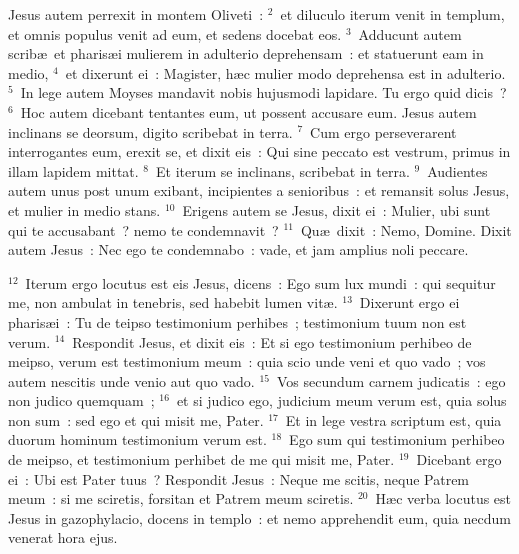 \lettrine[lines=3,image=true,loversize=0.05,lraise=-0.03]{J}{}esus autem perrexit in montem Oliveti~:
${}^{2}$~et diluculo iterum venit in templum, et omnis populus venit ad eum, et sedens docebat eos.
${}^{3}$~Adducunt autem scrib\ae\ et pharis\ae i mulierem in adulterio deprehensam~: et statuerunt eam in medio,
${}^{4}$~et dixerunt ei~: Magister, h\ae c mulier modo deprehensa est in adulterio.
${}^{5}$~In lege autem Moyses mandavit nobis hujusmodi lapidare. Tu ergo quid dicis~?
${}^{6}$~Hoc autem dicebant tentantes eum, ut possent accusare eum. Jesus autem inclinans se deorsum, digito scribebat in terra.
${}^{7}$~Cum ergo perseverarent interrogantes eum, erexit se, et dixit eis~: Qui sine peccato est vestrum, primus in illam lapidem mittat.
${}^{8}$~Et iterum se inclinans, scribebat in terra.
${}^{9}$~Audientes autem unus post unum exibant, incipientes a senioribus~: et remansit solus Jesus, et mulier in medio stans.
${}^{10}$~Erigens autem se Jesus, dixit ei~: Mulier, ubi sunt qui te accusabant~? nemo te condemnavit~?
${}^{11}$~Qu\ae\ dixit~: Nemo, Domine. Dixit autem Jesus~: Nec ego te condemnabo~: vade, et jam amplius noli peccare.


${}^{12}$~Iterum ergo locutus est eis Jesus, dicens~: Ego sum lux mundi~: qui sequitur me, non ambulat in tenebris, sed habebit lumen vit\ae .
${}^{13}$~Dixerunt ergo ei pharis\ae i~: Tu de teipso testimonium perhibes~; testimonium tuum non est verum.
${}^{14}$~Respondit Jesus, et dixit eis~: Et si ego testimonium perhibeo de meipso, verum est testimonium meum~: quia scio unde veni et quo vado~; vos autem nescitis unde venio aut quo vado.
${}^{15}$~Vos secundum carnem judicatis~: ego non judico quemquam~;
${}^{16}$~et si judico ego, judicium meum verum est, quia solus non sum~: sed ego et qui misit me, Pater.
${}^{17}$~Et in lege vestra scriptum est, quia duorum hominum testimonium verum est.
${}^{18}$~Ego sum qui testimonium perhibeo de meipso, et testimonium perhibet de me qui misit me, Pater.
${}^{19}$~Dicebant ergo ei~: Ubi est Pater tuus~? Respondit Jesus~: Neque me scitis, neque Patrem meum~: si me sciretis, forsitan et Patrem meum sciretis.
${}^{20}$~H\ae c verba locutus est Jesus in gazophylacio, docens in templo~: et nemo apprehendit eum, quia necdum venerat hora ejus.


